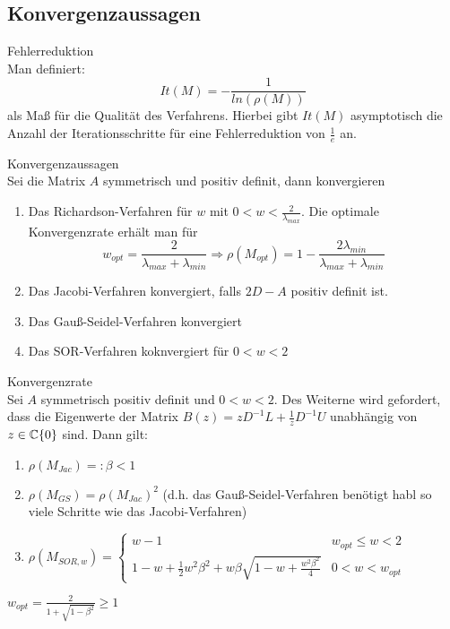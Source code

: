 \subsection{Konvergenzaussagen}
\begin{definition}
	 Fehlerreduktion
	\\
	Man definiert:
	$$It(M)=-\frac{1}{ln(\rho(M))}$$
	als Maß für die Qualität des Verfahrens. Hierbei gibt $It(M)$ asymptotisch die Anzahl der Iterationsschritte für eine Fehlerreduktion
	von $\frac{1}{e}$ an.
\end{definition}

\begin{theorem}
	Konvergenzaussagen
	\\
	Sei die Matrix $A$ symmetrisch und positiv definit, dann konvergieren
	\begin{enumerate}
		\item Das Richardson-Verfahren für $w$ mit $0<w<\frac{2}{\lambda_{max}}$. Die optimale Konvergenzrate erhält man für
		$$w_{opt}=\frac{2}{\lambda_{max}+\lambda_{min}}\Rightarrow \rho(M_{opt})=1-\frac{2\lambda_{min}}{\lambda_{max}+\lambda_{min}}$$
		\item Das Jacobi-Verfahren konvergiert, falls $2D-A$ positiv definit ist.
		\item Das Gauß-Seidel-Verfahren konvergiert
		\item Das SOR-Verfahren koknvergiert für $0<w<2$
	\end{enumerate}
\end{theorem}

\begin{theorem}
	Konvergenzrate
	\\
	Sei $A$ symmetrisch positiv definit und $0<w<2$. Des Weiterne wird gefordert, dass die Eigenwerte der Matrix $B(z)=zD^{-1}L+\frac{1}{z}D^{-1}U$
	unabhängig von $z\in \mathbb{C}\\ \{0\}$ sind. Dann gilt:
	\begin{enumerate}
		\item $\rho(M_{Jac})=:\beta<1$
		\item $\rho(M_{GS})=\rho(M_{Jac})^{2}$ (d.h. das Gauß-Seidel-Verfahren benötigt habl so viele Schritte wie das Jacobi-Verfahren)
		\item $\rho(M_{SOR,w})=
		\begin{cases}
		w-1 & w_{opt}\leq w<2\\
		1-w+\frac{1}{2}w^{2}\beta^{2}+w\beta\sqrt{1-w+\frac{w^{2}\beta^{2}}{4}} & 0 < w < w_{opt}
		\end{cases}$
	\end{enumerate}
	$w_{opt}=\frac{2}{1+\sqrt{1-\beta^{2}}}\geq 1$
\end{theorem}

